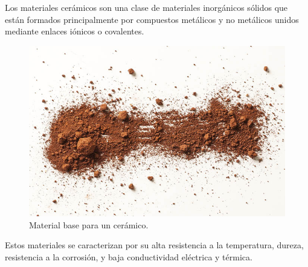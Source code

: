 \documentclass[12pt]{article}
\begin{document}
Los materiales cerámicos son una clase de materiales inorgánicos sólidos que están formados principalmente por compuestos metálicos y no metálicos unidos mediante enlaces iónicos o covalentes.
\begin{figure}[H]
    \centering
    \includegraphics[scale=0.7]{Imagenes/Piezoelectricidad_03.jpg}
    \caption{Material base para un cerámico.}
\end{figure}

Estos materiales se caracterizan por su alta resistencia a la temperatura, dureza,  resistencia a la corrosión, y baja conductividad eléctrica y térmica.
\end{document}
